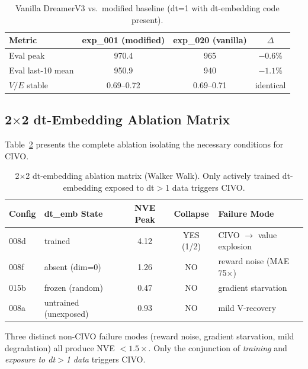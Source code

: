 \documentclass[10pt,letterpaper]{article}
\begin{document}
\begin{table}[h]
\centering
\caption{Vanilla DreamerV3 vs.\ modified baseline (dt=1 with dt-embedding code present).}
\label{tab:vanilla}
\begin{tabular}{lccc}
\toprule
Metric & exp\_001 (modified) & exp\_020 (vanilla) & $\Delta$ \\
\midrule
Eval peak & 970.4 & 965 & $-0.6\%$ \\
Eval last-10 mean & 950.9 & 940 & $-1.1\%$ \\
$V/E$ stable & 0.69--0.72 & 0.69--0.71 & identical \\
\bottomrule
\end{tabular}
\end{table}

\subsection{2$\times$2 dt-Embedding Ablation Matrix}
\label{sec:ablation}

Table~\ref{tab:ablation_matrix} presents the complete ablation isolating the necessary conditions for CIVO.

\begin{table}[h]
\centering
\caption{2$\times$2 dt-embedding ablation matrix (Walker Walk). Only actively trained dt-embedding exposed to dt$>$1 data triggers CIVO.}
\label{tab:ablation_matrix}
\begin{tabular}{llccl}
\toprule
Config & dt\_emb State & NVE Peak & Collapse & Failure Mode \\
\midrule
008d & trained & 4.12 & YES (1/2) & CIVO $\rightarrow$ value explosion \\
008f & absent (dim=0) & 1.26 & NO & reward noise (MAE 75$\times$) \\
015b & frozen (random) & 0.47 & NO & gradient starvation \\
008a & untrained (unexposed) & 0.93 & NO & mild V-recovery \\
\bottomrule
\end{tabular}
\end{table}

Three distinct non-CIVO failure modes (reward noise, gradient starvation, mild degradation) all produce NVE $< 1.5\times$.
Only the conjunction of \emph{training} and \emph{exposure to dt$>$1 data} triggers CIVO.

\end{document}
